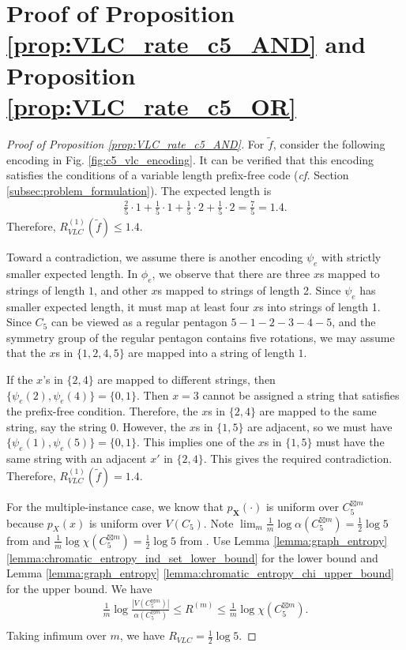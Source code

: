 \documentclass[journal, onecolumn, draftcls]{IEEEtran}
\theoremstyle{definition}
\newcommand{\bfX}{\mathbf{X}}
\begin{document}
\section{Proof of Proposition \ref{prop:VLC_rate_c5_AND} and  Proposition \ref{prop:VLC_rate_c5_OR}}\label{app:proof_VLC_rate_c5}
\begin{proof}[Proof of Proposition \ref{prop:VLC_rate_c5_AND}]
For $\tilde f$, consider the following   encoding in Fig. \ref{fig:c5_vlc_encoding}.
It can be verified that this encoding satisfies the conditions of a variable length prefix-free code ({\it cf.} Section \ref{subsec:problem_formulation}). The expected length is 
\begin{align*}
\frac{2}{5}\cdot 1 + \frac{1}{5}\cdot 1 + \frac{1}{5}\cdot 2 + \frac{1}{5}\cdot 2= \frac{7}{5} = 1.4.
\end{align*}
Therefore, $R_{VLC}^{(1)}(\tilde f) \le 1.4$. 

Toward a contradiction, we assume there is another encoding $\psi_e$ with strictly smaller expected length.  In $\phi_e$, we observe that there are three $x$s mapped to strings of length $1$, and other $x$s mapped to strings of length 2.   Since $\psi_e$ has smaller expected length, it must map at least four $x$s into strings of length 1. Since $C_5$ can be viewed as a regular pentagon $5-1-2-3-4-5$, and the symmetry group of the regular pentagon contains five rotations, we may assume that the $x$s in $\{1,2,4,5\}$ are mapped into a string of length $1$. 

If the $x$'s in $\{2,4\}$ are mapped to different strings, then $\{\psi_e(2),\psi_e(4)\} = \{0,1\}$. Then $x=3$ cannot be assigned a string that satisfies the prefix-free condition. Therefore, the $x$s in $\{2,4\}$ are mapped to the same string, say the string $0$. However, the $x$s in $\{1,5\}$ are adjacent, so we must have $\{\psi_e(1),\psi_e(5)\} = \{0,1\}$. This implies one of the $x$s in $\{1,5\}$ must have the same string with an adjacent $x'$ in $\{2,4\}$. This gives the required contradiction. Therefore, $R_{VLC}^{(1)}(\tilde f) = 1.4.$
 
For the multiple-instance case, we know that $p_{\bfX}(\cdot)$ is uniform over $C_5^{\boxtimes m}$ because $p_X(x)$ is uniform over $V(C_5)$. Note $\lim_m\frac{1}{m}\log \alpha(C_5^{\boxtimes m})=\frac{1}{2}\log 5$ from   \cite{lovasz1979shannon} and $\frac{1}{m} \log \chi(C_5^{\boxtimes m})  = \frac{1}{2}\log 5$ from \cite{Witsenhausen_76}. Use Lemma \ref{lemma:graph_entropy} \ref{lemma:chromatic_entropy_ind_set_lower_bound} for the lower bound  and  Lemma \ref{lemma:graph_entropy} \ref{lemma:chromatic_entropy_chi_upper_bound} for the upper bound. We have
\begin{align*}
     \frac{1}{m} \log \frac{|V(C_5^{\boxtimes m})|}{\alpha(C_5^{\boxtimes m})} \le R^{(m)} \le \frac{1}{m} \log \chi(C_5^{\boxtimes m}). \\
\end{align*}  
Taking infimum over $m$, we have $R_{VLC} = \frac{1}{2}\log 5$.
\end{proof}
\end{document}
